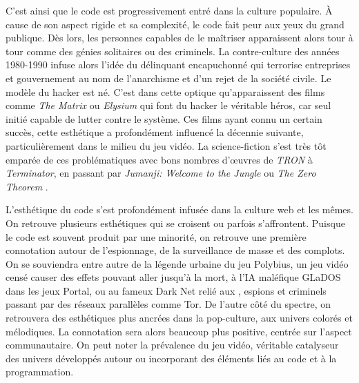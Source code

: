 \documentclass[12pt]{article} %
\begin{document}
C'est ainsi que le code est progressivement entré dans la culture populaire. À cause de son aspect rigide et sa complexité, le code fait peur aux yeux du grand publique. Dès lors, les personnes capables de le maîtriser apparaissent alors tour à tour comme des génies solitaires ou des criminels. La contre-culture des années 1980-1990 infuse alors l'idée du délinquant encapuchonné qui terrorise entreprises et gouvernement au nom de l'anarchisme et d'un rejet de la société civile. Le modèle du hacker est né. C'est dans cette optique qu'apparaissent des films comme \textit{The Matrix} ou \textit{Elysium} qui font du hacker le véritable héros, car seul initié capable de lutter contre le système. Ces films ayant connu un certain succès, cette esthétique a profondément influencé la décennie suivante, particulièrement dans le milieu du jeu vidéo. La science-fiction s'est très tôt emparée de ces problématiques avec bons nombres d'œuvres de \textit{TRON} à \textit{Terminator}, en passant par \textit{Jumanji: Welcome to the Jungle} ou \textit{The Zero Theorem} \cite{wikipedia-virtualRealityFilms}.

L'esthétique du code s'est profondément infusée dans la culture web et les mêmes. On retrouve plusieurs esthétiques qui se croisent ou parfois s'affrontent. Puisque le code est souvent produit par une minorité, on retrouve une première connotation autour de l'espionnage, de la surveillance de masse et des complots. On se souviendra entre autre de la légende urbaine du jeu Polybius, un jeu vidéo censé causer des effets pouvant aller jusqu'à la mort, à l'IA maléfique GLaDOS dans les jeux Portal, ou au fameux Dark Net relié aux , espions et criminels passant par des réseaux parallèles comme Tor. De l'autre côté du spectre, on retrouvera des esthétiques plus ancrées dans la pop-culture, aux univers colorés et mélodiques. La connotation sera alors beaucoup plus positive, centrée sur l'aspect communautaire. On peut noter la prévalence du jeu vidéo, véritable catalyseur des univers développés autour ou incorporant des éléments liés au code et à la programmation.
\end{document}

